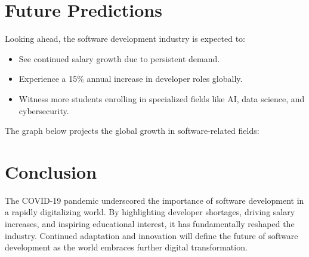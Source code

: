 \documentclass{article}
\begin{document}
\section{Future Predictions}
Looking ahead, the software development industry is expected to:
\begin{itemize}
    \item See continued salary growth due to persistent demand.
    \item Experience a 15\% annual increase in developer roles globally.
    \item Witness more students enrolling in specialized fields like AI, data science, and cybersecurity.
\end{itemize}

The graph below projects the global growth in software-related fields:


\section{Conclusion}
The COVID-19 pandemic underscored the importance of software development in a rapidly digitalizing world. By highlighting developer shortages, driving salary increases, and inspiring educational interest, it has fundamentally reshaped the industry. Continued adaptation and innovation will define the future of software development as the world embraces further digital transformation.
\end{document}
